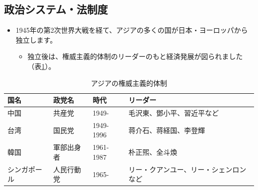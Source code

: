 \documentclass[
]{book}
\providecommand{\tightlist}{%
  \setlength{\itemsep}{0pt}\setlength{\parskip}{0pt}}
\begin{document}
\hypertarget{asia-politics}{%
\subsection{政治システム・法制度}\label{asia-politics}}

\begin{itemize}
\item
  1945年の第2次世界大戦を経て、アジアの多くの国が日本・ヨーロッパから独立します。

  \begin{itemize}
  \tightlist
  \item
    独立後は、権威主義的体制のリーダーのもと経済発展が図られました（表\ref{tab:authoritarian}）。
  \end{itemize}
\end{itemize}

\begin{table}

\caption{\label{tab:authoritarian}アジアの権威主義的体制}
\centering
\begin{tabular}[t]{l|l|l|l}
\hline
国名 & 政党名 & 時代 & リーダー\\
\hline
中国 & 共産党 & 1949- & 毛沢東、鄧小平、習近平など\\
\hline
台湾 & 国民党 & 1949-1996 & 蒋介石、蒋経国、李登輝\\
\hline
韓国 & 軍部出身者 & 1961-1987 & 朴正煕、全斗煥\\
\hline
シンガポール & 人民行動党 & 1965- & リー・クアンユー、リー・シェンロンなど\\
\hline
\end{tabular}
\end{table}
\end{document}
